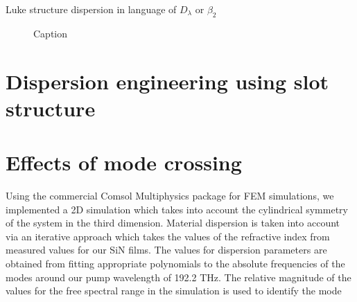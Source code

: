 Luke \cite{Luke2015a}
structure dispersion
in language of $D_\lambda$ or $\beta_2$

\begin{figure}
    \centering
    
    \caption{Caption}
    \label{fig:my_label}
\end{figure}

\section{Dispersion engineering using slot structure}

\section{Effects of mode crossing}


Using the commercial Comsol Multiphysics package for FEM simulations, we implemented a 2D simulation which takes into account the cylindrical symmetry of the system in the third dimension. Material dispersion is taken into account via an iterative approach which takes the values of the refractive index from measured values for our SiN films. The values for dispersion parameters are obtained from fitting appropriate polynomials to the absolute frequencies of the modes around our pump wavelength of 192.2 THz. The relative magnitude of the values for the free spectral range in the simulation is used to identify the mode